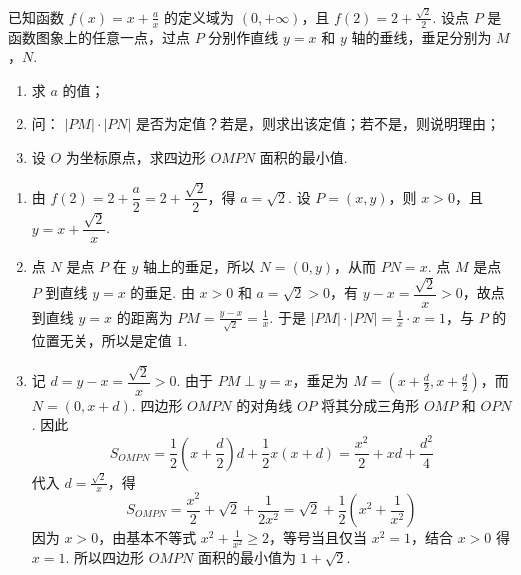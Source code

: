 \begin{problem}
已知函数 \( f(x) = x + \frac{a}{x} \) 的定义域为 \((0, +\infty)\)，且 \( f(2) = 2 + \frac{\sqrt{2}}{2} \). 设点 \(P\) 是函数图象上的任意一点，过点 \(P\) 分别作直线 \( y = x \) 和 \( y \) 轴的垂线，垂足分别为 \(M\)，\(N\).

\begin{enumerate}
\item 求 \(a\) 的值；
\item 问： \( |PM| \cdot |PN| \) 是否为定值？若是，则求出该定值；若不是，则说明理由；
\item 设 \(O\) 为坐标原点，求四边形 \(OMPN\) 面积的最小值.
\end{enumerate}

\end{problem}

\begin{solution}
\begin{enumerate}
\item 由 \(f(2)=2+\dfrac{a}{2}=2+\dfrac{\sqrt2}{2}\)，得 \(a=\sqrt2\). 设 \(P=(x,y)\)，则 \(x>0\)，且
\(y=x+\dfrac{\sqrt2}{x}\).

\item 点 \(N\) 是点 \(P\) 在 \(y\) 轴上的垂足，所以 \(N=(0,y)\)，从而 \(PN=x\). 点 \(M\) 是点 \(P\) 到直线 \(y=x\) 的垂足. 由 \(x>0\) 和 \(a=\sqrt2>0\)，有 \(y-x=\dfrac{\sqrt2}{x}>0\)，故点到直线 \(y=x\) 的距离为
\(\displaystyle PM=\frac{y-x}{\sqrt2}=\frac1x\).
于是
\(\displaystyle |PM|\cdot|PN|=\frac1x\cdot x=1\)，与 \(P\) 的位置无关，所以是定值 \(1\).

\item 记 \(d=y-x=\dfrac{\sqrt2}{x}>0\). 由于 \(PM\perp y=x\)，垂足为
\(\displaystyle M=\left(x+\frac d2,x+\frac d2\right)\)，而 \(N=(0,x+d)\).
四边形 \(OMPN\) 的对角线 \(OP\) 将其分成三角形 \(OMP\) 和 \(OPN\). 因此
\[
S_{OMPN}
=\frac12\left(x+\frac d2\right)d+\frac12x(x+d)
=\frac{x^2}{2}+xd+\frac{d^2}{4}
\]
代入 \(\displaystyle d=\frac{\sqrt2}{x}\)，得
\[
S_{OMPN}
=\frac{x^2}{2}+\sqrt2+\frac1{2x^2}
=\sqrt2+\frac12\left(x^2+\frac1{x^2}\right)
\]
因为 \(x>0\)，由基本不等式
\(\displaystyle x^2+\frac1{x^2}\geqslant2\)，等号当且仅当 \(x^2=1\)，结合 \(x>0\) 得 \(x=1\). 所以四边形 \(OMPN\) 面积的最小值为 \(1+\sqrt2\).
\end{enumerate}
\end{solution}

